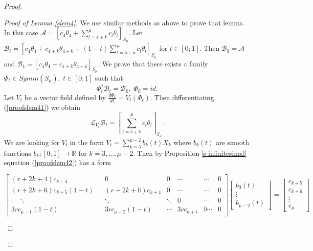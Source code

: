 \documentclass{amsart}
\theoremstyle{definition}
\numberwithin{equation}{section}
\begin{document}
\begin{proof}
\begin{proof}[Proof of Lemma \ref{slem4}]
We use similar methods as above to prove that lemma. In this case
$\mathcal{A}\!= [c_4 \theta_4+\sum_{l=4+k}^{\mu}c_{l} \theta_{l}]_{S_{\mu}}$.   Let $\mathcal{B}_t\!=[c_4 \theta_4+c_{4+k} \theta_{4+k}\!+(1\!-\!t)\sum_{l=5+k}^{\mu}c_{l} \theta_{l}]_{S_{\mu}}$ \; for $t \in[0;1]$. Then $\mathcal{B}_0=\mathcal{A}$\; and
\;$\mathcal{B}_1=[c_4 \theta_4+c_{4+k} \theta_{4+k}]_{S_{\mu}}$.
 We prove that there exists a family $\Phi_t \in Symm(S_{\mu}),\;t\in [0;1]$ such that
 \begin{equation}
\label{proofslem41}   \Phi_t^*\mathcal{B}_t=\mathcal{B}_0,\;\Phi_0=id.
\end{equation}
Let $V_t$ be a vector field defined by $\frac{d \Phi_t}{dt}=V_t(\Phi_t)$. Then differentiating (\ref{proofslem41}) we obtain
  \begin{equation}
\label{proofslem42}   \mathcal L_{V_t} \mathcal{B}_t=[\sum_{l=5+k}^{\mu}c_{l} \theta_{l}]_{S_{\mu}}.
\end{equation}
We are looking for $V_t$ in the form $V_t=\sum_{k=3}^{\mu-2}b_k(t) X_k$   where $b_k(t)$ are smooth functions $b_k:[0;1]\rightarrow \mathbb{R}$ for $k=3,\ldots,\mu-2$.  Then by Proposition  \ref{s-infinitesimal} equation (\ref{proofslem42})
has a form

\setlength{\arraycolsep}{0.3mm}
\begin{small}
\begin{equation}  \label{proofslem43}
\left[ \begin{array}{ccccccc}

 (r\!+\!2k+4)c_{k\!+\!4} & & 0 & 0 \  & \cdots & \cdots & 0 \\
  (r\!+\!2k\!+\!6)c_{k\!+\!5}(1-t) & & (r\!+\!2k\!+\!6)c_{k\!+\!4} & 0 \  & \cdots & \cdots & 0 \\
 \vdots \;\; \;\ddots &  &  \ddots & \ddots & 0 &\cdots & 0 \\
 3rc_{\mu-1}(1-t) & & 3rc_{\mu-2}(1-t) & \cdots & 3rc_{k\!+\!4} & 0 \cdots & 0
\end{array} \right]
\left[ \begin{array}{c}  b_3(t) \\ \vdots  \\ b_{\mu-2}(t)  \end{array} \right] =
\left[ \begin{array}{c}  c_{k+5} \\ c_{k+6} \\ \vdots \\  c_{\mu}  \end{array}  \right]
\end{equation}
\end{small}


\end{proof}
\end{proof}
\end{document}
